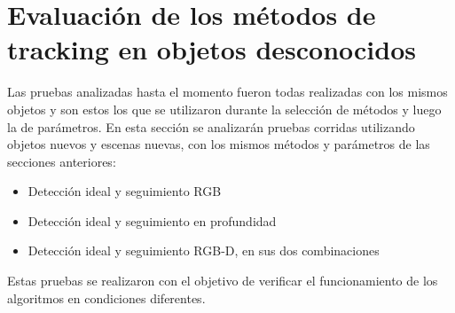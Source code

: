 \section{Evaluación de los métodos de tracking en objetos desconocidos}
Las pruebas analizadas hasta el momento fueron todas realizadas con los mismos objetos y son estos los que se utilizaron durante la selección de métodos y luego la de parámetros. En esta sección se analizarán pruebas corridas utilizando objetos nuevos y escenas nuevas, con los mismos métodos y parámetros de las secciones anteriores:
\begin{itemize}
	\item Detección ideal y seguimiento RGB
	\item Detección ideal y seguimiento en profundidad
	\item Detección ideal y seguimiento RGB-D, en sus dos combinaciones
\end{itemize}

Estas pruebas se realizaron con el objetivo de verificar el funcionamiento de los algoritmos en condiciones diferentes.


